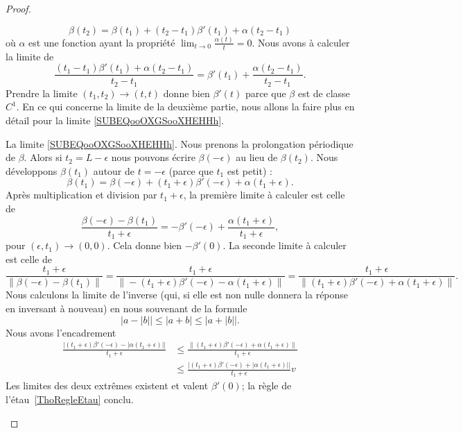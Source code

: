 \begin{proof}
\begin{subproof}
		\begin{equation}
			\beta(t_2)=\beta(t_1)+(t_2-t_1)\beta'(t_1)+\alpha(t_2-t_1)
		\end{equation}
		où \( \alpha\) est une fonction ayant la propriété \( \lim_{t\to 0} \frac{ \alpha(t) }{ t }=0\). Nous avons à calculer la limite de
		\begin{equation}
			\frac{ (t_1-t_1)\beta'(t_1)+\alpha(t_2-t_1) }{ t_2-t_1 }=\beta'(t_1)+\frac{ \alpha(t_2-t_1) }{ t_2-t_1 }.
		\end{equation}
		Prendre la limite \( (t_1,t_2)\to (t,t)\) donne bien \( \beta'(t)\) parce que \( \beta\) est de classe \( C^1\). En ce qui concerne la limite de la deuxième partie, nous allons la faire plus en détail pour la limite \eqref{SUBEQooOXGSooXHEHHh}.

		La limite \eqref{SUBEQooOXGSooXHEHHh}. Nous prenons la prolongation périodique de \( \beta\). Alors si \( t_2=L-\epsilon\) nous pouvons écrire \( \beta(-\epsilon)\) au lieu de \( \beta(t_2)\). Nous développons \( \beta(t_1)\) autour de \( t=-\epsilon\) (parce que \( t_1\) est petit) :
		\begin{equation}
			\beta(t_1)=\beta(-\epsilon)+(t_1+\epsilon)\beta'(-\epsilon)+\alpha(t_1+\epsilon).
		\end{equation}
		Après multiplication et division par \( t_1+\epsilon\), la première limite à calculer est celle de
		\begin{equation}
			\frac{ \beta(-\epsilon)-\beta(t_1) }{ t_1+\epsilon }=-\beta'(-\epsilon)+\frac{ \alpha(t_1+\epsilon) }{ t_1+\epsilon },
		\end{equation}
		pour \( (\epsilon,t_1)\to (0,0)\). Cela donne bien \( -\beta'(0)\). La seconde limite à calculer est celle de
		\begin{equation}
			\frac{ t_1+\epsilon }{ \| \beta(-\epsilon)-\beta(t_1) \| }=\frac{ t_1+\epsilon }{ \| -(t_1+\epsilon)\beta'(-\epsilon)-\alpha(t_1+\epsilon) \| }=\frac{ t_1+\epsilon }{ \| (t_1+\epsilon)\beta'(-\epsilon)+\alpha(t_1+\epsilon) \| }.
		\end{equation}
		Nous calculons la limite de l'inverse (qui, si elle est non nulle donnera la réponse en inversant à nouveau) en nous souvenant de la formule
		\begin{equation}
			\big|  a-| b | \big|  \leq | a+b |\leq \big|    a+| b |\big|.
		\end{equation}
		Nous avons l'encadrement
		\begin{subequations}
			\begin{align}
				\frac{  \big| (t_1+\epsilon)\beta'(-\epsilon)-| \alpha(t_1+\epsilon) | \big| }{ t_1+\epsilon } & \leq \frac{ \|  (t_1+\epsilon)\beta'(-\epsilon)+ \alpha(t_1+\epsilon) \|  }{ t_1+\epsilon }           \\
				                                                                                               & \leq  \frac{ \big|   (t_1+\epsilon)\beta'(-\epsilon)+| \alpha(t_1+\epsilon) | \big| }{ t_1+\epsilon }
				v
			\end{align}
		\end{subequations}
		Les limites des deux extrêmes existent et valent \( \beta'(0)\); la règle de l'étau~\ref{ThoRegleEtau} conclu.


\end{subproof}
\end{proof}
